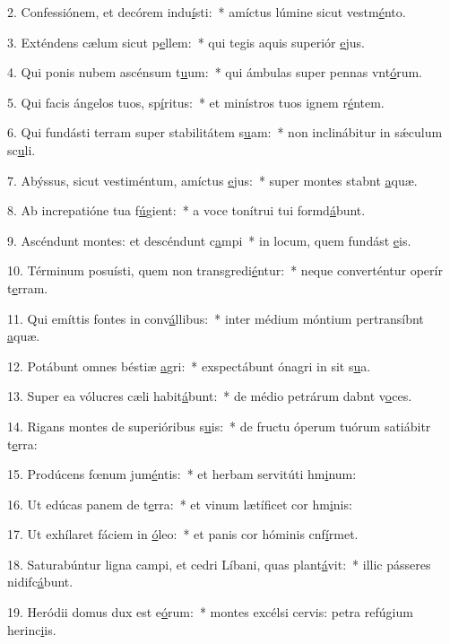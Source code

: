 2. Confessiónem, et decórem indu\uline{í}sti:~* amíctus lúmine sicut vestm\uline{é}nto.\par 
3. Exténdens cælum sicut p\uline{e}llem:~* qui tegis aquis superiór \uline{e}jus.\par 
4. Qui ponis nubem ascénsum t\uline{u}um:~* qui ámbulas super pennas vnt\uline{ó}rum.\par 
5. Qui facis ángelos tuos, sp\uline{í}ritus:~* et minístros tuos ignem r\uline{é}ntem.\par 
6. Qui fundásti terram super stabilitátem s\uline{u}am:~* non inclinábitur in sǽculum sc\uline{u}li.\par 
7. Abýssus, sicut vestiméntum, amíctus \uline{e}jus:~* super montes stabnt \uline{a}quæ.\par 
8. Ab increpatióne tua f\uline{ú}gient:~* a voce tonítrui tui formd\uline{á}bunt.\par 
9. Ascéndunt montes: et descéndunt c\uline{a}mpi~* in locum, quem fundást \uline{e}is.\par 
10. Términum posuísti, quem non transgredi\uline{é}ntur:~* neque converténtur operír t\uline{e}rram.\par 
11. Qui emíttis fontes in conv\uline{á}llibus:~* inter médium móntium pertransíbnt \uline{a}quæ.\par 
12. Potábunt omnes béstiæ \uline{a}gri:~* exspectábunt ónagri in sit s\uline{u}a.\par 
13. Super ea vólucres cæli habit\uline{á}bunt:~* de médio petrárum dabnt v\uline{o}ces.\par 
14. Rigans montes de superióribus s\uline{u}is:~* de fructu óperum tuórum satiábitr t\uline{e}rra:\par 
15. Prodúcens fœnum jum\uline{é}ntis:~* et herbam servitúti hm\uline{i}num:\par 
16. Ut edúcas panem de t\uline{e}rra:~* et vinum lætíficet cor hm\uline{i}nis:\par 
17. Ut exhílaret fáciem in \uline{ó}leo:~* et panis cor hóminis cnf\uline{í}rmet.\par 
18. Saturabúntur ligna campi, et cedri Líbani, quas plant\uline{á}vit:~* illic pásseres nidifc\uline{á}bunt.\par 
19. Heródii domus dux est e\uline{ó}rum:~* montes excélsi cervis: petra refúgium herinc\uline{i}is.\par 
